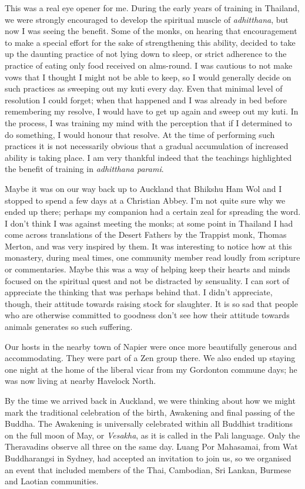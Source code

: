 This was a real eye opener for me. During the early years of training in
Thailand, we were strongly encouraged to develop the spiritual muscle of
\emph{adhitthana}, but now I was seeing the benefit. Some of the monks,
on hearing that encouragement to make a special effort for the sake of
strengthening this ability, decided to take up the daunting practice of
not lying down to sleep, or strict adherence to the practice of eating
only food received on alms-round. I was cautious to not make vows that I
thought I might not be able to keep, so I would generally decide on such
practices as sweeping out my kuti every day. Even that minimal level of
resolution I could forget; when that happened and I was already in bed
before remembering my resolve, I would have to get up again and sweep
out my kuti. In the process, I was training my mind with the perception
that if I determined to do something, I would honour that resolve. At
the time of performing such practices it is not necessarily obvious that
a gradual accumulation of increased ability is taking place. I am very
thankful indeed that the teachings highlighted the benefit of training
in \emph{adhitthana parami}.

Maybe it was on our way back up to Auckland that Bhikshu Ham Wol and I
stopped to spend a few days at a Christian Abbey. I'm not quite sure why
we ended up there; perhaps my companion had a certain zeal for spreading
the word. I don't think I was against meeting the monks; at some point
in Thailand I had come across translations of the Desert Fathers\cite{desert}
by the Trappist monk, Thomas Merton, and was very
inspired by them. It was interesting to notice how at this monastery,
during meal times, one community member read loudly from scripture or
commentaries. Maybe this was a way of helping keep their hearts and
minds focused on the spiritual quest and not be distracted by
sensuality. I can sort of appreciate the thinking that was perhaps
behind that. I didn't appreciate, though, their attitude towards raising
stock for slaughter.
It is so sad that people who are otherwise committed to goodness don't see how
their attitude towards animals generates so such suffering.

Our hosts in the nearby town of Napier were once more beautifully
generous and accommodating. They were part of a Zen group there. We also
ended up staying one night at the home of the liberal vicar from my
Gordonton commune days; he was now living at nearby Havelock North.

By the time we arrived back in Auckland, we were thinking about how we
might mark the traditional celebration of the birth, Awakening and final
passing of the Buddha. The Awakening is universally celebrated within
all Buddhist traditions on the full moon of May, or \emph{Vesakha}, as
it is called in the Pali language. Only the Theravadins observe all
three on the same day. Luang Por Mahasamai, from Wat Buddharangsi in
Sydney, had accepted an invitation to join us, so we organised an event
that included members of the Thai, Cambodian, Sri Lankan, Burmese and
Laotian communities.

